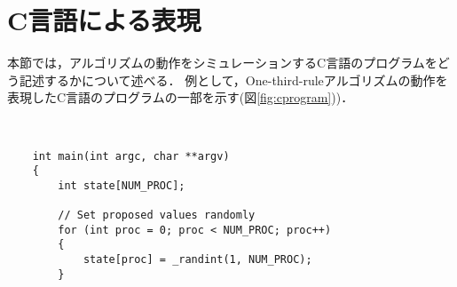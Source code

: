 \documentclass[technicalreport]{ieicej}
\theoremstyle{plain}
\begin{document}
\section{C言語による表現}\label{sec:clang}

本節では，アルゴリズムの動作をシミュレーションするC言語のプログラムをどう記述するかについて述べる．
例として，One-third-ruleアルゴリズムの動作を表現したC言語のプログラムの一部を示す(図\ref{fig:cprogram}))．


\begin{figure*}
	\centering　{\scriptsize
\begin{lstlisting}
    int main(int argc, char **argv)
    {
        int state[NUM_PROC];
                
        // Set proposed values randomly
        for (int proc = 0; proc < NUM_PROC; proc++)
        {
            state[proc] = _randint(1, NUM_PROC);
        }
        

\end{lstlisting}}
\end{figure*}
\end{document}
